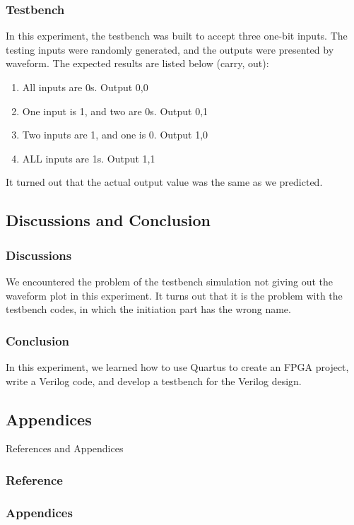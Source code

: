     \subsubsection{Testbench}
    In this experiment, the testbench was built to accept three one-bit inputs. The testing inputs were randomly generated, and the outputs were presented by waveform. The expected results are listed below (carry, out):
    \begin{enumerate}
        \item All inputs are 0s. Output 0,0
        \item One input is 1, and two are 0s. Output 0,1
        \item Two inputs are 1, and one is 0. Output 1,0
        \item ALL inputs are 1s. Output 1,1
    \end{enumerate}
    It turned out that the actual output value was the same as we predicted.

\subsection{Discussions and Conclusion}
    \subsubsection{Discussions}%
    We encountered the problem of the testbench simulation not giving out the waveform plot in this experiment. It turns out that it is the problem with the testbench codes, in which the initiation part has the wrong name.
    \subsubsection{Conclusion}
    In this experiment, we learned how to use Quartus to create an FPGA project, write a Verilog code, and develop a testbench for the Verilog design.
\subsection{Appendices} References and Appendices
    \subsubsection{Reference}%
    \subsubsection{Appendices}%